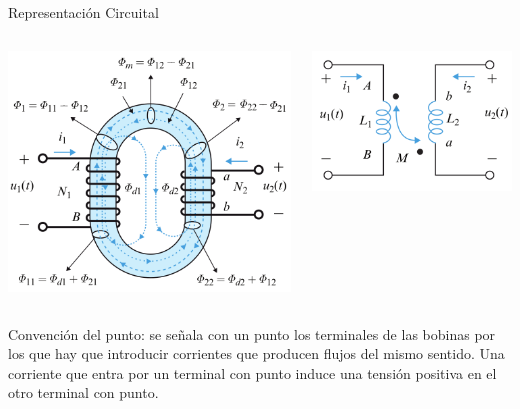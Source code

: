 \documentclass[xcolor={usenames,svgnames,dvipsnames}]{beamer}
\begin{document}
\begin{frame}[label={sec:orgcafe3e8}]{Representación Circuital}
\begin{columns}
\begin{column}{0.5\columnwidth}
\begin{center}
\includegraphics[height=0.45\textheight]{figs/Acoplamiento2.png}
\end{center}
\end{column}

\begin{column}{0.5\columnwidth}
\begin{center}
\includegraphics[height=0.45\textheight]{figs/Acoplamiento2_circuito.png}
\end{center}
\end{column}
\end{columns}
\alert{Convención del punto}: se señala con un punto los terminales de las
bobinas por los que hay que introducir corrientes que producen flujos
del mismo sentido. Una corriente que entra por un terminal con punto
induce una tensión positiva en el otro terminal con punto.
\end{frame}
\end{document}
